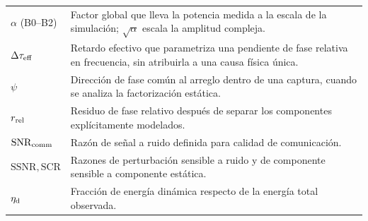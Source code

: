 \begin{longtable}{P{3.6cm}P{10.0cm}}
$\alpha$ (B0--B2) & Factor global que lleva la potencia medida a la escala de la simulación; $\sqrt{\alpha}$ escala la amplitud compleja.\\
$\Delta\tau_{\rm eff}$ & Retardo efectivo que parametriza una pendiente de fase relativa en frecuencia, sin atribuirla a una causa física única.\\
$\psi$ & Dirección de fase común al arreglo dentro de una captura, cuando se analiza la factorización estática.\\
$r_{\rm rel}$ & Residuo de fase relativo después de separar los componentes explícitamente modelados.\\
$\mathrm{SNR}_{\rm comm}$ & Razón de señal a ruido definida para calidad de comunicación.\\
$\mathrm{SSNR},\mathrm{SCR}$ & Razones de perturbación sensible a ruido y de componente sensible a componente estática.\\
$\eta_{\rm d}$ & Fracción de energía dinámica respecto de la energía total observada.\\

\bottomrule
\end{longtable}
\endgroup
\clearpage
